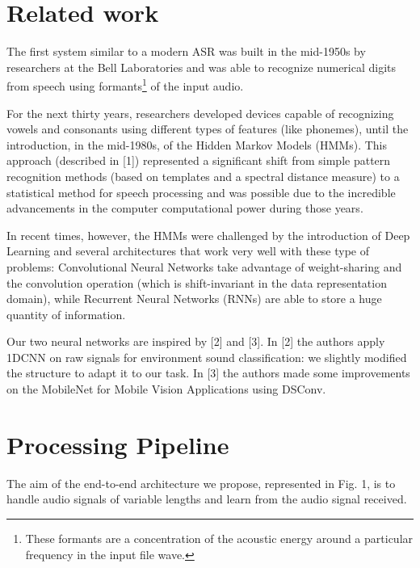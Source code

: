 \documentclass[conference]{IEEEtran}
\begin{document}

\section{Related work}
The first system similar to a modern ASR was built in the mid-1950s by researchers at the Bell Laboratories and was able to recognize numerical digits from speech using formants\footnote{These formants are a concentration of the acoustic energy around a particular frequency in the input file wave.} of the input audio.  

For the next thirty years, researchers developed devices capable of recognizing vowels and consonants using different types of features (like phonemes), until the introduction, in the mid-1980s, of the Hidden Markov Models (HMMs). This approach (described in [1]) represented a significant shift from simple pattern recognition methods (based on templates and a spectral distance measure) to a statistical method for speech processing and was possible due to the incredible advancements in the computer computational power during those years.

In recent times, however, the HMMs were challenged by the introduction of Deep Learning and several architectures that work very well with these type of problems: Convolutional Neural Networks take advantage of weight-sharing and the convolution operation (which is shift-invariant in the data representation domain), while Recurrent Neural Networks (RNNs) are able to store a huge quantity of information.

Our two neural networks are inspired by [2] and [3]. In [2] the authors apply 1DCNN on raw signals for environment sound classification: we slightly modified the structure to adapt it to our task. In [3] the authors made some improvements on the MobileNet for Mobile Vision Applications using DSConv. 
\hfill

\section{Processing Pipeline}
The aim of the end-to-end architecture we propose, represented in Fig. 1, is to handle audio signals of variable lengths and learn from the audio signal received.
\end{document}
